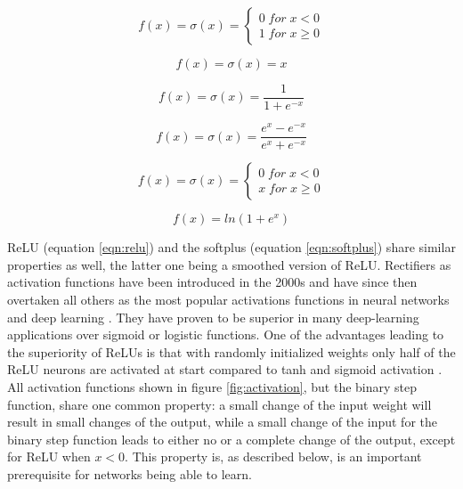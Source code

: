 \begin{equation}
 f(x)= \sigma(x) = \left\{
 \begin{array}{ll}
 0 \; for \; x < 0 \\ 
 1 \; for \; x \geq 0
 \end{array}
\right .
\label{eqn:binary}
\end{equation}

\begin{equation}
 f(x) = \sigma(x) = x
 \label{eqn:ident}
\end{equation}
    
\begin{equation}
 f(x) = \sigma(x) = \frac{1}{1+e^{-x}} 
 \label{eqn:sigmoid}
\end{equation}

\begin{equation}
 f(x) = \sigma(x) = \frac{e^x - e^{-x}}{e^x + e^{-x}}
 \label{eqn:tanh}
\end{equation}

\begin{equation}
 f(x)= \sigma(x) = \left\{
 \begin{array}{ll}
 0 \; for \; x < 0 \\ 
 x \; for \; x \geq 0
 \end{array}
\right .
\label{eqn:relu}
\end{equation}

\begin{equation}
 f(x) = ln(1+e^x)
 \label{eqn:softplus}
\end{equation}


ReLU (equation \ref{eqn:relu}) and the softplus (equation \ref{eqn:softplus}) share similar
properties as well, the latter one being a smoothed version of ReLU. Rectifiers as activation
functions have been introduced in the 2000s \cite{hahnloser2000digital} and have since then
overtaken all others as the most popular activations functions in neural networks and deep learning
\cite{lecun2015deep}. They have proven to be superior in many deep-learning applications over
sigmoid or logistic functions. One of the advantages leading to the superiority of ReLUs is that
with randomly initialized weights only half of the ReLU neurons are activated at start compared to
tanh and sigmoid activation \cite{glorot2011deep}. All activation functions shown in figure
\ref{fig:activation}, but the binary step function, share one common property: a small change of the
input weight will result in small changes of the output, while a small change of the input for the
binary step function leads to either no or a complete change of the output, except for ReLU when
$x<0$. This property is, as described below, is an important prerequisite for networks being able to learn. \\

